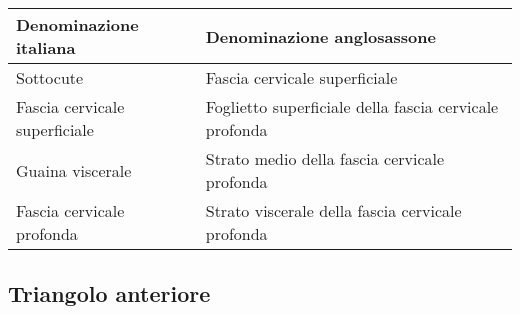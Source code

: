 \documentclass[italian,]{article}
\newcommand{\normalbox}[2]{\begin{tcolorbox}[title=#1]#2\end{tcolorbox}} %
\begin{document}
\normalbox{Differenze di nomenclatura delle fasce tra denominazione europea e denominazione anglosassone}{
\begin{longtable}[]{@{}ll@{}} \toprule \begin{minipage}[b]{0.47\columnwidth}\raggedright Denominazione italiana\strut \end{minipage} & \begin{minipage}[b]{0.47\columnwidth}\raggedright Denominazione anglosassone\strut \end{minipage}\tabularnewline \midrule \endhead \begin{minipage}[t]{0.47\columnwidth}\raggedright Sottocute\strut \end{minipage} & \begin{minipage}[t]{0.47\columnwidth}\raggedright Fascia cervicale superficiale\strut \end{minipage}\tabularnewline \begin{minipage}[t]{0.47\columnwidth}\raggedright Fascia cervicale superficiale\strut \end{minipage} & \begin{minipage}[t]{0.47\columnwidth}\raggedright Foglietto superficiale della fascia cervicale profonda\strut \end{minipage}\tabularnewline \begin{minipage}[t]{0.47\columnwidth}\raggedright Guaina viscerale\strut \end{minipage} & \begin{minipage}[t]{0.47\columnwidth}\raggedright Strato medio della fascia cervicale profonda\strut \end{minipage}\tabularnewline \begin{minipage}[t]{0.47\columnwidth}\raggedright Fascia cervicale profonda\strut \end{minipage} & \begin{minipage}[t]{0.47\columnwidth}\raggedright Strato viscerale della fascia cervicale profonda\strut \end{minipage}\tabularnewline \bottomrule \end{longtable} 
}

\hypertarget{triangolo-anteriore}{%
\subsection{Triangolo anteriore}\label{triangolo-anteriore}}
\end{document}
